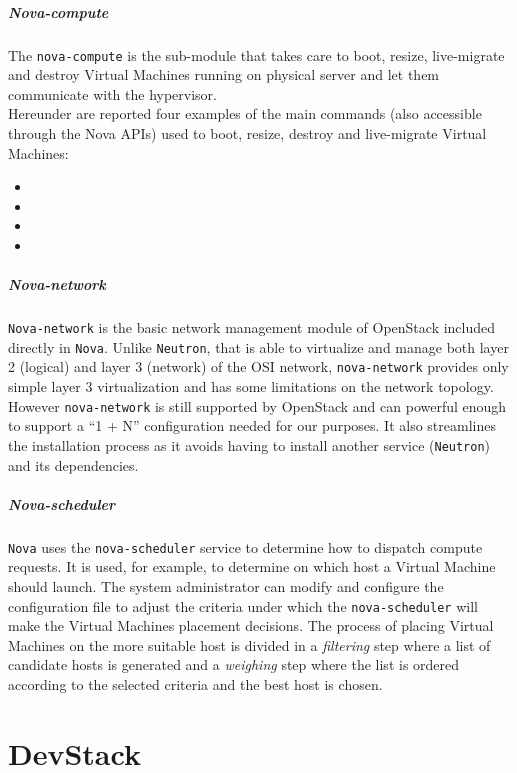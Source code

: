 \subparagraph{Nova-compute}
\label{par:openstack_nova_compute}
The \texttt{nova-compute} is the sub-module that takes care to boot, resize, live-migrate and destroy Virtual Machines running on physical server and let them communicate with the hypervisor.\\
Hereunder are reported four examples of the main commands (also accessible through the Nova APIs) used to boot, resize, destroy and live-migrate Virtual Machines:
\begin{itemize}
	\item {}
	\item {}
	\item {}
	\item {}
\end{itemize}

\subparagraph{Nova-network}
\label{par:openstack_nova_net}
\texttt{Nova-network} is the basic network management module of OpenStack included directly in \texttt{Nova}. Unlike \texttt{Neutron}, that is able to virtualize and manage both layer 2 (logical) and layer 3 (network) of the OSI network, \texttt{nova-network} provides only simple layer 3 virtualization and has some limitations on the network topology.\\
However \texttt{nova-network} is still supported by OpenStack and can powerful enough to support a ``1 + N'' configuration needed for our purposes. It also streamlines the installation process as it avoids having to install another service (\texttt{Neutron}) and its dependencies.

\subparagraph{Nova-scheduler}
\label{par:openstack_nova_sched}
\texttt{Nova} uses the \texttt{nova-scheduler} service to determine how to dispatch compute requests. It is used, for example, to determine on which host a Virtual Machine should launch. The system administrator can modify and configure the  configuration file to adjust the criteria under which the \texttt{nova-scheduler} will make the Virtual Machines placement decisions. The process of placing Virtual Machines on the more suitable host is divided in a \textit{filtering} step where a list of candidate hosts is generated and a \textit{weighing} step where the list is ordered according to the selected criteria and the best host is chosen.

\section{DevStack}
\label{sec:devstack}
 
